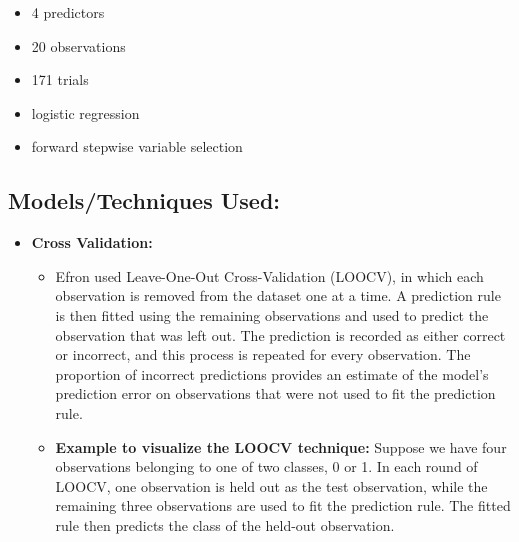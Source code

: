 \documentclass[
  letterpaper,
  DIV=11,
  numbers=noendperiod]{scrreprt}
\providecommand{\tightlist}{%
  \setlength{\itemsep}{0pt}\setlength{\parskip}{0pt}}
\begin{document}
\begin{itemize}
  \begin{itemize}
  \tightlist
  \item
    4 predictors
  \item
    20 observations
  \item
    171 trials
  \item
    logistic regression
  \item
    forward stepwise variable selection
  \end{itemize}
\end{itemize}

\subsection{Models/Techniques Used:}\label{modelstechniques-used}

\begin{itemize}
\item
  \textbf{Cross Validation:}

  \begin{itemize}
  \item
    Efron used Leave-One-Out Cross-Validation (LOOCV), in which each
    observation is removed from the dataset one at a time. A prediction
    rule is then fitted using the remaining observations and used to
    predict the observation that was left out. The prediction is
    recorded as either correct or incorrect, and this process is
    repeated for every observation. The proportion of incorrect
    predictions provides an estimate of the model's prediction error on
    observations that were not used to fit the prediction rule.
  \item
    \textbf{Example to visualize the LOOCV technique:} Suppose we have
    four observations belonging to one of two classes, 0 or 1. In each
    round of LOOCV, one observation is held out as the test observation,
    while the remaining three observations are used to fit the
    prediction rule. The fitted rule then predicts the class of the
    held-out observation.
  \end{itemize}


\end{itemize}
\end{document}
